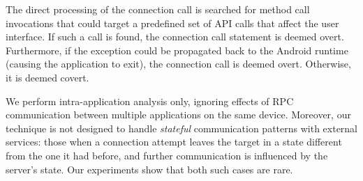 The direct processing of the connection call is searched for method
call invocations that could target a predefined set of API calls that
affect the user interface.  If such a call is found, the connection
call statement is deemed overt.  Furthermore, if the exception
could be propagated back to the Android runtime (causing the
application to exit), the connection call is deemed overt.
Otherwise, it is deemed covert.




We perform intra-application analysis only, ignoring effects of RPC communication between multiple applications on the same device. Moreover, our technique is not designed to handle
\emph{stateful} communication patterns with external services: those when a connection attempt leaves the target in a state different from the one it had before, and further communication is influenced by the server's state. Our experiments show that both such cases are rare. 

